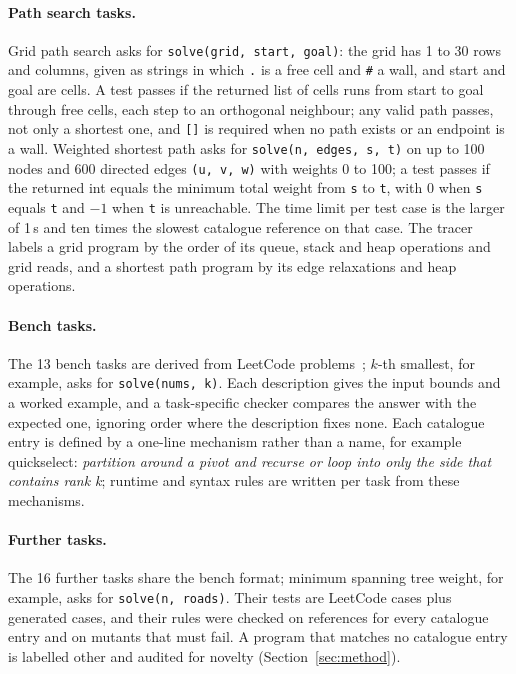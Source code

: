 \documentclass[11pt,letterpaper]{article}
\begin{document}
\paragraph{Path search tasks.} Grid path search asks for \texttt{solve(grid, start, goal)}: the grid has 1 to 30 rows and columns, given as strings in which \texttt{.} is a free cell and \texttt{\#} a wall, and start and goal are cells. A test passes if the returned list of cells runs from start to goal through free cells, each step to an orthogonal neighbour; any valid path passes, not only a shortest one, and \texttt{[]} is required when no path exists or an endpoint is a wall. Weighted shortest path asks for \texttt{solve(n, edges, s, t)} on up to 100 nodes and 600 directed edges \texttt{(u, v, w)} with weights 0 to 100; a test passes if the returned int equals the minimum total weight from \texttt{s} to \texttt{t}, with 0 when \texttt{s} equals \texttt{t} and $-1$ when \texttt{t} is unreachable. The time limit per test case is the larger of 1\,s and ten times the slowest catalogue reference on that case. The tracer labels a grid program by the order of its queue, stack and heap operations and grid reads, and a shortest path program by its edge relaxations and heap operations.

\paragraph{Bench tasks.} The 13 bench tasks are derived from LeetCode problems~\citep{Xia2025}; $k$-th smallest, for example, asks for \texttt{solve(nums, k)}. Each description gives the input bounds and a worked example, and a task-specific checker compares the answer with the expected one, ignoring order where the description fixes none. Each catalogue entry is defined by a one-line mechanism rather than a name, for example quickselect: \emph{partition around a pivot and recurse or loop into only the side that contains rank k}; runtime and syntax rules are written per task from these mechanisms.

\paragraph{Further tasks.} The 16 further tasks share the bench format; minimum spanning tree weight, for example, asks for \texttt{solve(n, roads)}. Their tests are LeetCode cases plus generated cases, and their rules were checked on references for every catalogue entry and on mutants that must fail. A program that matches no catalogue entry is labelled other and audited for novelty (Section~\ref{sec:method}).
\end{document}
